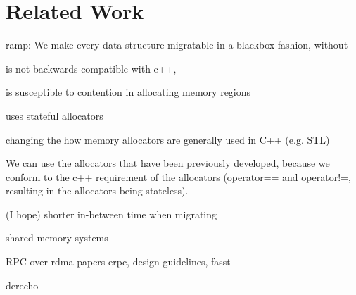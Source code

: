 \chapter{Related Work}
\label{chap:related}

ramp: We make every data structure migratable in a blackbox fashion, without

is not backwards compatible with c++,

is susceptible to contention in allocating memory regions

uses stateful allocators

changing the how memory allocators are generally used in C++ (e.g. STL)

We can use the allocators that have been previously developed, because we
conform to the c++ requirement of the allocators (operator== and operator!=,
resulting in the allocators being stateless).

(I hope) shorter in-between time when migrating




shared memory systems


RPC over rdma papers erpc, design guidelines, fasst 


derecho

